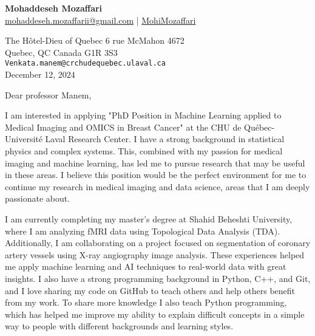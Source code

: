 \documentclass[letterpaper,11pt]{letter}
\begin{document}
\begin{center}
    \textbf{\Huge Mohaddeseh Mozaffari} \\
    \small{\href{mailto:mohaddeseh.mozaffarii@gmail.com}{ mohaddeseh.mozaffarii@gmail.com} | 	\href{https://www.linkedin.com/in/MohiMozaffari/}{ MohiMozaffari}}
\end{center}

\vspace{1em}

\begin{flushleft}
    The Hôtel-Dieu of Quebec 6 rue McMahon 4672\\
    Quebec, QC Canada G1R 3S3\\
    \texttt{Venkata.manem@crchudequebec.ulaval.ca} \\
    December 12, 2024
\end{flushleft}

\vspace{1em}

\begin{flushleft}
    Dear professor Manem,
\end{flushleft}

\vspace{1em}
I am interested in applying "PhD Position in Machine Learning applied to Medical Imaging and OMICS in Breast Cancer" at the CHU de Québec-Université Laval Research Center. I have a strong background in statistical physics and complex systems. This, combined with my passion for medical imaging and machine learning, has led me to pursue research that may be useful in these areas. I believe this position would be the perfect environment for me to continue my research in medical imaging and data science, areas that I am deeply passionate about.

I am currently completing my master's degree at Shahid Beheshti University, where I am analyzing fMRI data using Topological Data Analysis (TDA). Additionally, I am collaborating on a project focused on segmentation of coronary artery vessels using X-ray angiography image analysis. These experiences helped me apply machine learning and AI techniques to real-world data with great insights. I also have a strong programming background in Python, C++, and Git, and I love sharing my code on GitHub to teach others and help others benefit from my work. To share more knowledge I also teach Python programming, which has helped me improve my ability to explain difficult concepts in a simple way to people with different backgrounds and learning styles.
\end{document}
